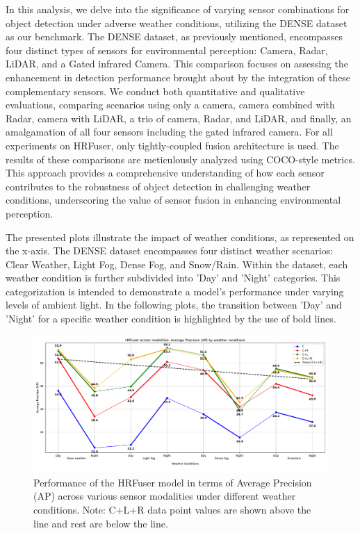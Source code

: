 \documentclass[report.tex]{subfiles}
\begin{document}
    In this analysis, we delve into the significance of varying sensor combinations for object detection under adverse weather conditions, utilizing the DENSE dataset as our benchmark. The DENSE dataset, as previously mentioned, encompasses four distinct types of sensors for environmental perception: Camera, Radar, LiDAR, and a Gated infrared Camera. This comparison focuses on assessing the enhancement in detection performance brought about by the integration of these complementary sensors. We conduct both quantitative and qualitative evaluations, comparing scenarios using only a camera, camera combined with Radar, camera with LiDAR, a trio of camera, Radar, and LiDAR, and finally, an amalgamation of all four sensors including the gated infrared camera. For all experiments on HRFuser, only tightly-coupled fusion architecture is used. The results of these comparisons are meticulously analyzed using COCO-style metrics. This approach provides a comprehensive understanding of how each sensor contributes to the robustness of object detection in challenging weather conditions, underscoring the value of sensor fusion in enhancing environmental perception.

    The presented plots illustrate the impact of weather conditions, as represented on the x-axis. The DENSE dataset encompasses four distinct weather scenarios: Clear Weather, Light Fog, Dense Fog, and Snow/Rain. Within the dataset, each weather condition is further subdivided into 'Day' and 'Night' categories. This categorization is intended to demonstrate a model's performance under varying levels of ambient light. In the following plots, the transition between 'Day' and 'Night' for a specific weather condition is highlighted by the use of bold lines.

    \begin{figure}[h!]
        \centering
        \includegraphics[width=1.0\textwidth]{images/results/hrfuser/ap.pdf}
        \caption{Performance of the HRFuser model in terms of Average Precision (AP) across various sensor modalities under different weather conditions. Note: C+L+R data point values are shown above the line and rest are below the line.}
        \label{fig:hrfuser_ap}
    \end{figure}
\end{document}
